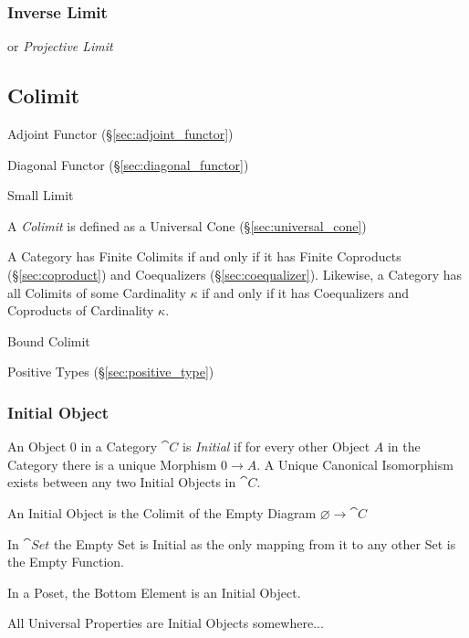 \subsubsection{Inverse Limit}\label{sec:inverse_limit}

or \emph{Projective Limit}



\subsection{Colimit}\label{sec:colimit}

Adjoint Functor (\S\ref{sec:adjoint_functor})

Diagonal Functor (\S\ref{sec:diagonal_functor})

Small Limit

A \emph{Colimit} is defined as a Universal Cone
(\S\ref{sec:universal_cone})

A Category has Finite Colimits if and only if it has Finite Coproducts
(\S\ref{sec:coproduct}) and Coequalizers (\S\ref{sec:coequalizer}).
Likewise, a Category has all Colimits of some Cardinality $\kappa$ if
and only if it has Coequalizers and Coproducts of Cardinality
$\kappa$.

Bound Colimit %

Positive Types (\S\ref{sec:positive_type})



\subsubsection{Initial Object}\label{sec:initial_object}

An Object $0$ in a Category $\cat{C}$ is \emph{Initial} if for
every other Object $A$ in the Category there is a unique Morphism $0
\rightarrow A$. A Unique Canonical Isomorphism exists between any two
Initial Objects in $\cat{C}$.

An Initial Object is the Colimit of the Empty Diagram $\varnothing
\rightarrow \cat{C}$

In $\cat{Set}$ the Empty Set is Initial as the only mapping from it
to any other Set is the Empty Function.

In a Poset, the Bottom Element is an Initial Object.

All Universal Properties are Initial Objects somewhere...



